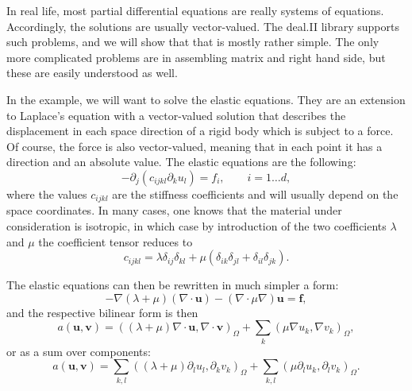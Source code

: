 \documentclass{article}
\renewcommand{\vec}[1]{{\mathbf #1}}
\renewcommand{\div}{\nabla \cdot}
\begin{document}
In real life, most partial differential equations are really systems
of equations. Accordingly, the solutions are usually
vector-valued. The deal.II library supports such problems, and we will show
that that is mostly rather simple. The only more complicated problems
are in assembling matrix and right hand side, but these are easily
understood as well. 

In the example, we will want to solve the elastic equations. They are
an extension to Laplace's equation with a vector-valued solution that
describes the displacement in each space direction of a rigid body
which is subject to a force. Of course, the force is also
vector-valued, meaning that in each point it has a direction and an
absolute value. The elastic equations are the following:
$$
  -
  \partial_j (c_{ijkl} \partial_k u_l)
  =
  f_i,
  \qquad
  i=1\ldots d,
$$
where the values $c_{ijkl}$ are the stiffness coefficients and
will usually depend on the space coordinates. In
many cases, one knows that the material under consideration is
isotropic, in which case by introduction of the two coefficients
$\lambda$ and $\mu$ the coefficient tensor reduces to
$$
  c_{ijkl} 
  =
  \lambda \delta_{ij} \delta_{kl} + 
  \mu (\delta_{ik} \delta_{jl} + \delta_{il} \delta_{jk}).
$$

The elastic equations can then be rewritten in much simpler a form:
$$
   -
   \nabla (\lambda+\mu) (\div \vec u)
   -
   (\nabla \cdot \mu \nabla) \vec u
   =
   \vec f,
$$
and the respective bilinear form is then
$$
  a(\vec u, \vec v) =
  \left(
    (\lambda+\mu) \div \vec u, \div \vec v
  \right)_\Omega
  +
  \sum_k
  \left(
    \mu \nabla u_k, \nabla v_k
  \right)_\Omega,
$$
or as a sum over components:
$$
  a(\vec u, \vec v) =
  \sum_{k,l}
  \left(
    (\lambda+\mu) \partial_l u_l, \partial_k v_k
  \right)_\Omega
  +
  \sum_{k,l}
  \left(
    \mu \partial_l u_k, \partial_l v_k
  \right)_\Omega.
$$
\end{document}
